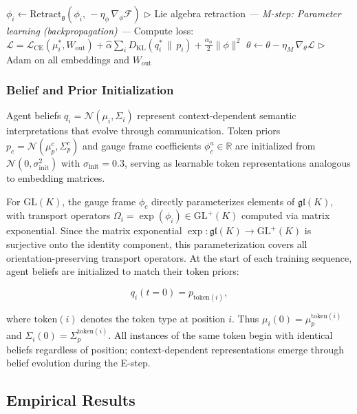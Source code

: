 \documentclass[twoside,11pt]{article}
\newcommand{\KL}{\operatorname{KL}}
\begin{document}
\begin{algorithm}[t]
\begin{algorithmic}[1]
    \STATE $\phi_i \leftarrow \mathrm{Retract}_{\mathfrak{g}}(\phi_i,\, -\eta_\phi\, \nabla_\phi \mathcal{F})$ \hfill $\triangleright$ Lie algebra retraction
\ENDFOR
\STATE
\STATE \textit{--- M-step: Parameter learning (backpropagation) ---}
\STATE Compute loss: $\mathcal{L} = \mathcal{L}_{\text{CE}}(\mu_i^*, W_{\text{out}}) + \hat\alpha\sum_i D_{\KL}(q_i^* \,\|\, p_i) + \frac{\alpha_\phi}{2}\|\phi\|^2$
\STATE $\theta \leftarrow \theta - \eta_M\, \nabla_\theta \mathcal{L}$ \hfill $\triangleright$ Adam on all embeddings and $W_{\text{out}}$
\end{algorithmic}
\end{algorithm}

\subsubsection{Belief and Prior Initialization}

Agent beliefs $q_i = \mathcal{N}(\mu_i, \Sigma_i)$ represent context-dependent semantic interpretations that evolve through communication. Token priors $p_c = \mathcal{N}(\mu_p^c, \Sigma_p^c)$ and gauge frame coefficients $\phi_c^a \in \mathbb{R}$ are initialized from $\mathcal{N}(0, \sigma_{\text{init}}^2)$ with $\sigma_{\text{init}} = 0.3$, serving as learnable token representations analogous to embedding matrices.

For $\mathrm{GL}(K)$, the gauge frame $\phi_c$ directly parameterizes elements of $\mathfrak{gl}(K)$, with transport operators $\Omega_i = \exp(\phi_i) \in \mathrm{GL}^+(K)$ computed via matrix exponential. Since the matrix exponential $\exp: \mathfrak{gl}(K) \to \mathrm{GL}^+(K)$ is surjective onto the identity component, this parameterization covers all orientation-preserving transport operators. At the start of each training sequence, agent beliefs are initialized to match their token priors:

\begin{equation}
q_i(t=0) = p_{\text{token}(i)},
\end{equation}

where $\text{token}(i)$ denotes the token type at position $i$. Thus $\mu_i(0) = \mu_p^{\text{token}(i)}$ and $\Sigma_i(0) = \Sigma_p^{\text{token}(i)}$. All instances of the same token begin with identical beliefs regardless of position; context-dependent representations emerge through belief evolution during the E-step.

\subsection{Empirical Results}
\end{document}

